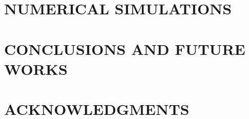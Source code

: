 \documentclass[letterpaper, 10 pt, conference]{ieeeconf}  %
\newcommand{\contTilde}[1]{\mathbf{\tilde{#1}}}
\newcommand{\transpose}{\mathsf{T}}
\newtheorem{lemma}{Lemma}
\begin{document}





\section{NUMERICAL SIMULATIONS}

\section{CONCLUSIONS AND FUTURE WORKS}

\section{ACKNOWLEDGMENTS}
\end{document}
